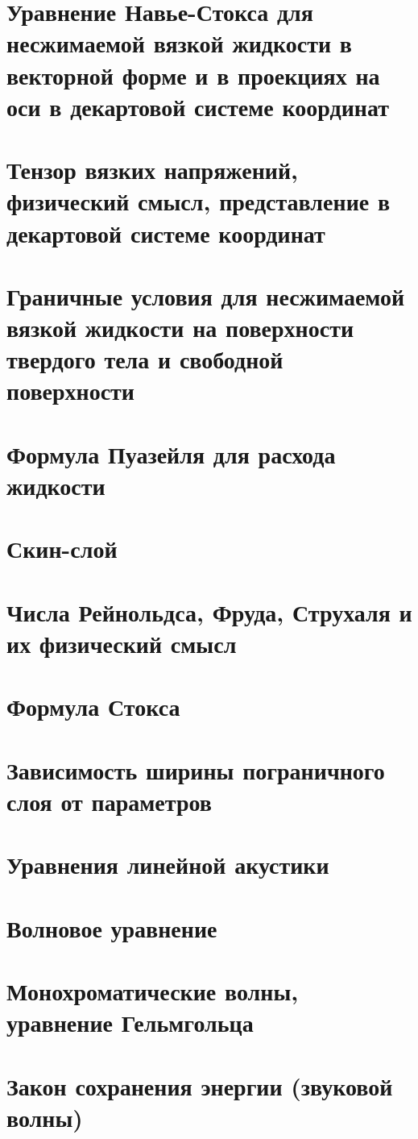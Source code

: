 \begin{multicols*}{5}
		\section{Уравнение Навье-Стокса для несжимаемой вязкой жидкости в векторной форме и в проекциях на оси в декартовой системе координат}
		\section{Тензор вязких напряжений, физический смысл, представление в декартовой системе координат}
		\section{Граничные условия для несжимаемой вязкой жидкости на поверхности твердого тела и свободной поверхности}
		\section{Формула Пуазейля для расхода жидкости}
		\section{Скин-слой}
		\section{Числа Рейнольдса, Фруда, Струхаля и их физический смысл}
		\section{Формула Стокса}
		\section{Зависимость ширины пограничного слоя от параметров}
		\section{Уравнения линейной акустики}
		\section{Волновое уравнение}
		\section{Монохроматические волны, уравнение Гельмгольца}
		\section{Закон сохранения энергии (звуковой волны)}
	\end{multicols*}
